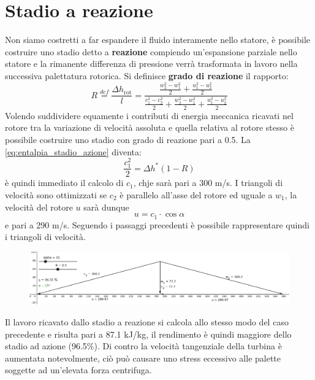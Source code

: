 \documentclass[a4paper,12pt]{article}
\begin{document}
\section{Stadio a reazione}
\label{sec:stadio_a_reazione}
Non siamo costretti a far espandere il fluido interamente nello statore, è possibile costruire uno stadio detto a \textbf{reazione} compiendo un'espansione parziale
nello statore e la rimanente differenza di pressione verrà trasformata in lavoro nella successiva palettatura rotorica.
Si definisce \textbf{grado di reazione} il rapporto:
\begin{equation}
    \label{eq:grado_di_reazione}
    R \stackrel{def}{=} \frac{\Delta h_{\text{rot}}}{l} = \frac{\frac{w_2^2-w_1^2}{2} + \frac{u_1^2 - u_2^2}{2} }  %
                                                                {\frac{c_1^2-c_2^2}{2} + \frac{w_2^2-w_1^2}{2} + \frac{u_1^2 - u_2^2}{2}}  %
\end{equation}
Volendo suddividere equamente i contributi di energia meccanica ricavati nel rotore tra la variazione di velocità assoluta e quella relativa al rotore stesso
è possibile costruire uno stadio con grado di reazione pari a 0.5.
La \eqref{eq:entalpia_stadio_azione} diventa:
\begin{equation}
    \frac{c_1^2}{2} = \Delta h^* (1-R)
\end{equation}
è quindi immediato il calcolo di $c_1$, chje sarà pari a 300 m/s.
I triangoli di velocità sono ottimizzati se $c_2$ è parallelo all'asse del rotore ed uguale a $w_1$, la velocità del rotore $u$ sarà dunque
\begin{equation}
    u = c_1 \cdot \cos \alpha
\end{equation}
e pari a 290 m/s.
Seguendo i passaggi precedenti è possibile rappresentare quindi i triangoli di velocità.
\begin{figure}[H]
    \label{fig:triangoli_reazione}
    \centering
    \includegraphics[width=\linewidth]{media/triangoli_reazione.png}
\end{figure}
Il lavoro ricavato dallo stadio a reazione si calcola allo stesso modo del caso precedente e risulta pari a 87.1 kJ/kg, il rendimento è quindi maggiore dello stadio
ad azione (96.5\%). Di contro la velocità tangenziale della turbina è aumentata notevolmente, ciò può causare uno stress eccessivo alle palette soggette ad un'elevata
forza centrifuga.
\end{document}
